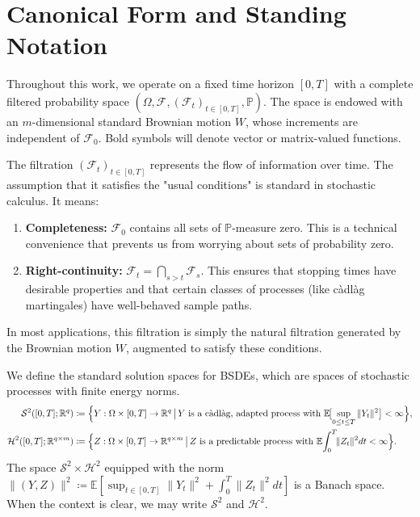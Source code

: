 \section{Canonical Form and Standing Notation}
\label{sec:core_notation}

Throughout this work, we operate on a fixed time horizon \([0, T]\) with a complete filtered probability space \((\Omega,\mathcal F,(\mathcal F_t)_{t\in[0,T]},\mathbb P)\). The space is endowed with an $m$-dimensional standard Brownian motion \(W\), whose increments are independent of \(\mathcal{F}_0\). Bold symbols will denote vector or matrix-valued functions.

\begin{remark}
The filtration \((\mathcal F_t)_{t\in[0,T]}\) represents the flow of information over time. The assumption that it satisfies the "usual conditions" is standard in stochastic calculus. It means:
\begin{enumerate}
    \item \textbf{Completeness:} \(\mathcal{F}_0\) contains all sets of \(\mathbb{P}\)-measure zero. This is a technical convenience that prevents us from worrying about sets of probability zero.
    \item \textbf{Right-continuity:} \(\mathcal{F}_t = \bigcap_{s>t} \mathcal{F}_s\). This ensures that stopping times have desirable properties and that certain classes of processes (like c\`adl\`ag martingales) have well-behaved sample paths.
\end{enumerate}
In most applications, this filtration is simply the natural filtration generated by the Brownian motion \(W\), augmented to satisfy these conditions.
\end{remark}

\begin{definition}
We define the standard solution spaces for BSDEs, which are spaces of stochastic processes with finite energy norms.
\begin{align*}
  \mathcal S^2([0,T]; \mathbb{R}^q) &\coloneqq \Bigl\{
        Y:\Omega\times[0,T]\to\mathbb R^q
        \,\big|\,
        Y\text{ is a c\`adl\`ag, adapted process with }
        \mathbb E\!\bigl[\sup_{0\le t\le T}\|Y_t\|^2\bigr]<\infty
      \Bigr\}, \\
  \mathcal H^2([0,T]; \mathbb{R}^{q \times m}) &\coloneqq \Bigl\{
        Z:\Omega\times[0,T]\to\mathbb R^{q\times m}
        \,\big|\,
        Z\text{ is a predictable process with }
        \mathbb E\!\int_0^T \!\!\|Z_t\|^2 dt<\infty
      \Bigr\}.
\end{align*}
The space \(\mathcal{S}^2 \times \mathcal{H}^2\) equipped with the norm \(\| (Y,Z) \|^2 \coloneqq \mathbb E[\sup_{t\in[0,T]}\|Y_t\|^2 + \int_0^T \|Z_t\|^2 dt]\) is a Banach space. When the context is clear, we may write \(\mathcal{S}^2\) and \(\mathcal{H}^2\).
\end{definition}

